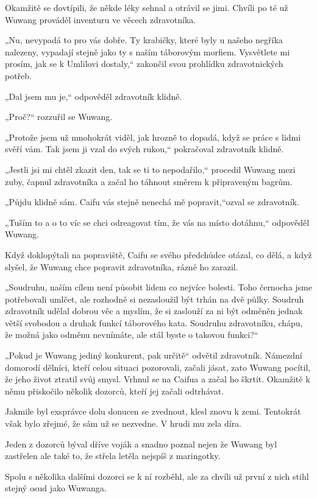  Okamžitě se dovtípili, že někde léky sehnal a otrávil se jimi. Chvíli po té už Wuwang prováděl inventuru ve věcech zdravotníka.
	
 „Nu, nevypadá to pro vás dobře. Ty krabičky, které byly u našeho negříka nalezeny, vypadají stejně jako ty s naším táborovým morfiem. Vysvětlete mi prosím, jak se k Umlilovi dostaly,“ zakončil svou prohlídku zdravotnických potřeb.
	
 „Dal jsem mu je,“ odpověděl zdravotník klidně.

„Proč?“ rozzuřil se Wuwang.
	
 „Protože jsem už mnohokrát viděl, jak hrozně to dopadá, když se práce s lidmi svěří vám. Tak jsem ji vzal do svých rukou,“ pokračoval zdravotník klidně.
	
 „Jestli jsi mi chtěl zkazit den, tak se ti to nepodařilo,“ procedil Wuwang mezi zuby, čapnul zdravotníka a začal ho táhnout směrem k připraveným bagrům.
	
 „Půjdu klidně sám. Caifu vás stejně nenechá mě popravit,“ozval se zdravotník.
	
 „Tuším to a o to víc se chci odreagovat tím, že vás na místo dotáhnu,“ odpověděl Wuwang.
	
 Když doklopýtali na popraviště, Caifu se svého předchůdce otázal, co dělá, a když slyšel, že Wuwang chce popravit zdravotníka, rázně ho zarazil.
	
 „Soudruhu, naším cílem není působit lidem co nejvíce bolesti. Toho černocha jsme potřebovali umlčet, ale rozhodně si nezasloužil být trhán na dvě půlky. Soudruh zdravotník udělal dobrou věc a myslím, že si zaslouží za ni být odměněn jednak větší svobodou a druhak funkcí táborového kata. Soudruhu zdravotníku, chápu, že možná jako odměnu nevnímáte, ale stál byste o takovou funkci?“
	
 „Pokud je Wuwang jediný konkurent, pak určitě“ odvětil zdravotník. 
Námezdní domorodí dělníci, kteří celou situaci pozorovali, začali jásat, zato Wuwang pocítil, že jeho život ztratil svůj smysl. Vrhnul se na Caifua a začal ho škrtit. Okamžitě k němu přiskočilo několik dozorců, kteří jej začali odtrhávat.
	
 Jakmile byl exsprávce dolu donucen se zvednout, klesl znovu k zemi. Tentokrát však bylo zřejmé, že sám už se nezvedne. V hrudi mu zela díra.
	
 Jeden z dozorců býval dříve voják a snadno poznal nejen že Wuwang byl zastřelen ale také to, že střela letěla nejspíš z maringotky. 
	
 Spolu s několika dalšími dozorci se k ní rozběhl, ale za chvíli už první z nich stihl stejný osud jako Wuwanga.

